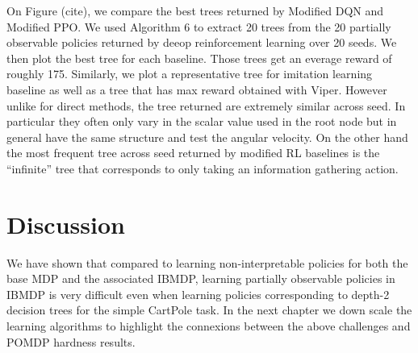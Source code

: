 On Figure (cite), we compare the best trees returned by Modified DQN and Modified PPO. We used Algorithm 6 to extract 20 trees from the 20 partially observable policies returned by deeop reinforcement learning over 20 seeds. We then plot the best tree for each baseline. Those trees get an everage reward of roughly 175.
Similarly, we plot a representative tree for imitation learning baseline as well as a tree that has max reward obtained with Viper. 
However unlike for direct methods, the tree returned are extremely similar across seed. In particular they often only vary in the scalar value used in the root node but in general have the same structure and test the angular velocity.
On the other hand the most frequent tree across seed returned by modified RL baselines is the ``infinite'' tree that corresponds to only taking an information gathering action.


\section{Discussion}
We have shown that compared to learning non-interpretable policies for both the base MDP and the associated IBMDP, learning partially observable policies in IBMDP is very difficult even when learning policies corresponding to depth-2 decision trees for the simple CartPole task.
In the next chapter we down scale the learning algorithms to highlight the connexions between the above challenges and POMDP hardness results.